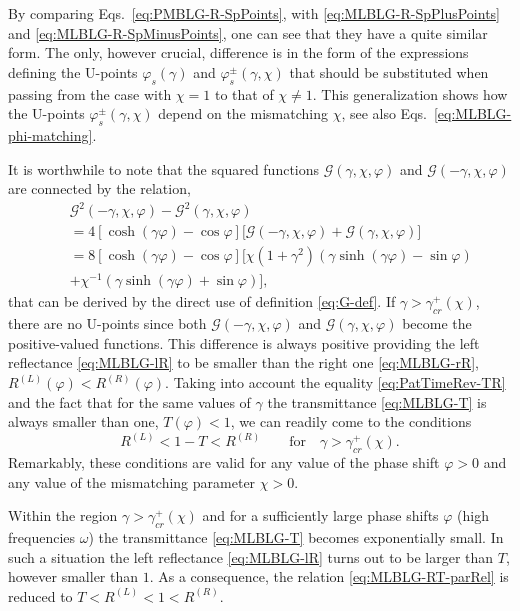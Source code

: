 \documentclass[aps,pra,reprint,showpacs,bibnotes,preprintnumbers,twoside,eqsecnum]{revtex4-1}
\begin{document}
By comparing Eqs.~\eqref{eq:PMBLG-R-SpPoints}, with \eqref{eq:MLBLG-R-SpPlusPoints} and \eqref{eq:MLBLG-R-SpMinusPoints}, one can see that they have a quite similar form. The only, however crucial, difference is in the form of the expressions defining the U-points $\varphi_s(\gamma)$ and $\varphi^{\pm}_s(\gamma,\chi)$ that should be substituted when passing from the case with $\chi=1$ to that of $\chi\neq 1$. This generalization shows how the U-points $\varphi^{\pm}_s(\gamma,\chi)$ depend on the mismatching $\chi$, see also Eqs.~\eqref{eq:MLBLG-phi-matching}.

It is worthwhile to note that the squared functions $\mathcal{G}(\gamma,\chi,\varphi)$ and $\mathcal{G}(-\gamma,\chi,\varphi)$ are connected by the relation,
%
\begin{eqnarray}\label{eq:MLBLG-G-rel}
&&\mathcal{G}^2(-\gamma,\chi,\varphi)-\mathcal{G}^2(\gamma,\chi,\varphi)\nonumber\\
&&=4[\cosh(\gamma\varphi)-\cos\varphi]\big[\mathcal{G}(-\gamma,\chi,\varphi)+\mathcal{G}(\gamma,\chi,\varphi)\big]\nonumber\\
&&=8[\cosh(\gamma\varphi)-\cos\varphi]\big[\chi(1+\gamma^2)(\gamma\sinh(\gamma\varphi)-\sin\varphi)\nonumber\\
&&+\chi^{-1}(\gamma\sinh(\gamma\varphi)+\sin\varphi)\big],
\end{eqnarray}
that can be derived by the direct use of definition \eqref{eq:G-def}. If $\gamma>\gamma_{cr}^{+}(\chi)$, there are no U-points since both $\mathcal{G}(-\gamma,\chi,\varphi)$ and $\mathcal{G}(\gamma,\chi,\varphi)$ become the positive-valued functions. This difference is always positive providing the left reflectance \eqref{eq:MLBLG-lR} to be smaller than the right one \eqref{eq:MLBLG-rR}, $R^{(L)}(\varphi)<R^{(R)}(\varphi)$. Taking into account the equality \eqref{eq:PatTimeRev-TR} and the fact that for the same values of $\gamma$ the transmittance \eqref{eq:MLBLG-T} is always smaller than one, $T(\varphi)<1$, we can readily come to the conditions
%
\begin{equation}\label{eq:MLBLG-RT-parRel}
R^{(L)}<1-T<R^{(R)}\qquad\mathrm{for}\quad\gamma>\gamma_{cr}^{+}(\chi).
\end{equation}
Remarkably, these conditions are valid for any value of the phase shift $\varphi>0$ and any value of the mismatching parameter $\chi>0$.

Within the region $\gamma>\gamma_{cr}^{+}(\chi)$ and for a sufficiently large phase shifts $\varphi$ (high frequencies $\omega$) the transmittance \eqref{eq:MLBLG-T} becomes exponentially small. In such a situation the left reflectance \eqref{eq:MLBLG-lR} turns out to be larger than $T$, however smaller than $1$. As a consequence, the relation \eqref{eq:MLBLG-RT-parRel} is reduced to $T<R^{(L)}<1<R^{(R)}$.
\end{document}
